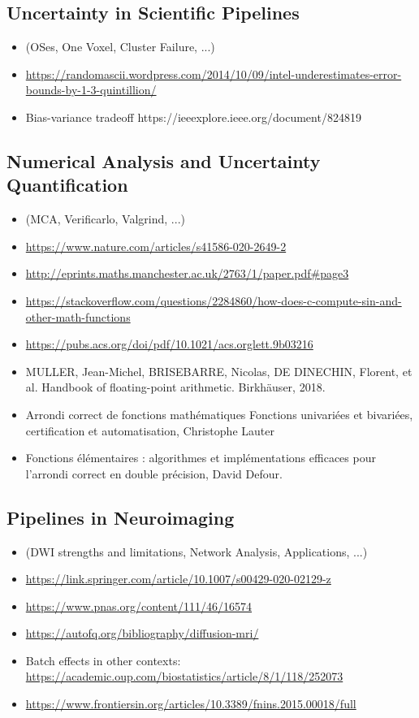 \documentclass[fleqn,12pt]{SelfArx} %
\begin{document}
\subsection{Uncertainty in Scientific Pipelines}
\begin{itemize}
\item (OSes, One Voxel, Cluster Failure, ...)
\item \url{https://randomascii.wordpress.com/2014/10/09/intel-underestimates-error-bounds-by-1-3-quintillion/}
\item Bias-variance tradeoff https://ieeexplore.ieee.org/document/824819
\end{itemize}

\subsection{Numerical Analysis and Uncertainty Quantification}
\begin{itemize}
\item (MCA, Verificarlo, Valgrind, ...)
\item \url{https://www.nature.com/articles/s41586-020-2649-2}
\item \url{http://eprints.maths.manchester.ac.uk/2763/1/paper.pdf#page3}
\item \url{https://stackoverflow.com/questions/2284860/how-does-c-compute-sin-and-other-math-functions}
\item \url{https://pubs.acs.org/doi/pdf/10.1021/acs.orglett.9b03216}
\item MULLER, Jean-Michel, BRISEBARRE, Nicolas, DE DINECHIN, Florent, et al. Handbook of floating-point arithmetic. Birkhäuser, 2018.
\item Arrondi correct de fonctions mathématiques Fonctions univariées et bivariées, certification et automatisation, Christophe Lauter
\item Fonctions élémentaires : algorithmes et implémentations efficaces pour l'arrondi correct en double précision, David Defour.
\end{itemize}

\subsection{Pipelines in Neuroimaging}
\begin{itemize}
\item (DWI strengths and limitations, Network Analysis, Applications, ...)
\item \url{https://link.springer.com/article/10.1007/s00429-020-02129-z}
\item \url{https://www.pnas.org/content/111/46/16574}
\item \url{https://autofq.org/bibliography/diffusion-mri/}
\item Batch effects in other contexts: \url{https://academic.oup.com/biostatistics/article/8/1/118/252073}
\item \url{https://www.frontiersin.org/articles/10.3389/fnins.2015.00018/full}
\end{itemize}
\end{document}
